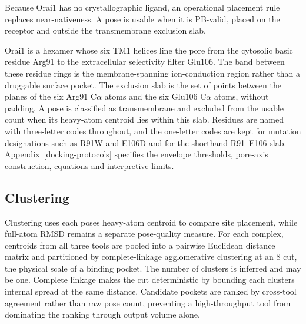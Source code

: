 Because Orai1 has no crystallographic ligand, an operational placement rule replaces near-nativeness. A pose is usable when it is PB-valid, placed on the receptor and outside the transmembrane exclusion slab.

Orai1 is a hexamer whose six TM1 helices line the pore from the cytosolic basic residue Arg91 to the extracellular selectivity filter Glu106. The band between these residue rings is the membrane-spanning ion-conduction region rather than a druggable surface pocket. The exclusion slab is the set of points between the planes of the six Arg91 C\ensuremath{\alpha} atoms and the six Glu106 C\ensuremath{\alpha} atoms, without padding. A pose is classified as transmembrane and excluded from the usable count when its heavy-atom centroid lies within this slab. Residues are named with three-letter codes throughout, and the one-letter codes are kept for mutation designations such as R91W and E106D and for the shorthand R91--E106 slab. Appendix~\ref{docking-protocols} specifies the envelope thresholds, pore-axis construction, equations and interpretive limits.

\hypertarget{clustering}{%
\subsection{Clustering}\label{clustering}}

Clustering uses each pose\textquotesingle s heavy-atom centroid to compare site placement, while full-atom RMSD remains a separate pose-quality measure. For each complex, centroids from all three tools are pooled into a pairwise Euclidean distance matrix and partitioned by complete-linkage agglomerative clustering at an 8\angstrom{} cut, the physical scale of a binding pocket. The number of clusters is inferred and may be one. Complete linkage makes the cut deterministic by bounding each cluster\textquotesingle s internal spread at the same distance. Candidate pockets are ranked by cross-tool agreement rather than raw pose count, preventing a high-throughput tool from dominating the ranking through output volume alone.

